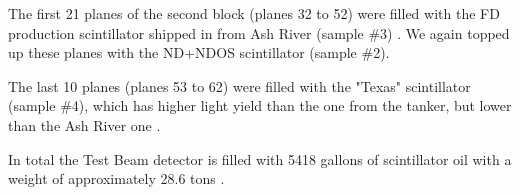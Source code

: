 



The first 21 planes of the second block (planes 32 to 52) were filled with the \gls{FD} production scintillator shipped in from Ash River (sample \#3) \cite{NOvA-doc-41961}. We again topped up these planes with the \gls{ND}+\gls{NDOS} scintillator (sample \#2).

The last 10 planes (planes 53 to 62) \cite{NOvA-doc-41961} were filled with the "Texas" scintillator (sample \#4), which has higher light yield than the one from the tanker, but lower than the Ash River one \cite{NOvA-doc-38740}.


In total the Test Beam detector is filled with 5418 gallons of scintillator oil with a weight of approximately 28.6 tons \cite{NOvA-doc-29543}.


